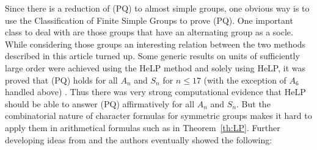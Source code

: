 \documentclass[10pt,a4paper,reqno]{amsart}
\theoremstyle{definition}
\theoremstyle{remark}
\begin{document}
Since there is a reduction of (PQ) to almost simple groups, one obvious way is to use the Classification of Finite Simple Groups to prove (PQ). One important class to deal with are those groups that have an alternating group as a socle. While considering those groups an interesting relation between the two methods described in this article turned up. Some generic results on units of sufficiently large order were achieved using the HeLP method \cite{BC17} and solely using HeLP, it was proved that (PQ) holds for all $A_n$ and $S_n$ for $n \leqslant 17$ (with the exception of $A_6$ handled above) \cite{Sal11, Sal13, BC17}. Thus there was very strong computational evidence that HeLP should be able to answer (PQ) affirmatively for all $A_n$ and $S_n$. But the combinatorial nature of character formulas for symmetric groups makes it hard to apply them in arithmetical formulas such as in Theorem~\ref{th:LP}. Further developing ideas from \cite{4primaryII} and \cite{Mar19} the authors eventually showed the following:
\end{document}
